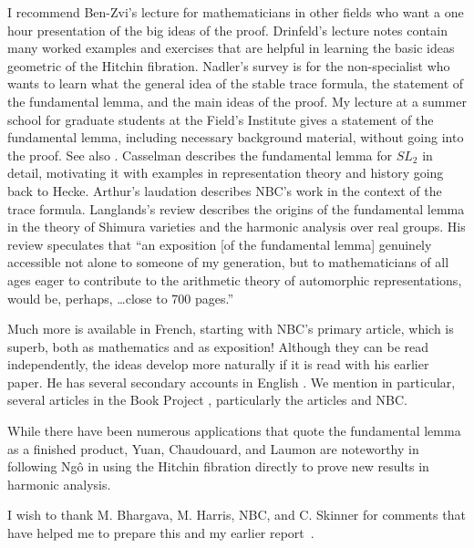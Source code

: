 \documentclass[brochure,english,12pt]{bourbaki}
\begin{document}
I recommend Ben-Zvi's lecture for mathematicians in other fields who
want a one hour presentation of the big ideas of the proof.
Drinfeld's lecture notes contain many worked examples and exercises
that are helpful in learning the basic ideas geometric of the Hitchin
fibration.  Nadler's survey is for the non-specialist who wants to
learn what the general idea of the stable trace formula, the statement
of the fundamental lemma, and the main ideas of the proof.  My lecture
at a summer school for graduate students at the Field's Institute
gives a statement of the fundamental lemma, including necessary
background material, without going into the proof.  See also
\cite{Hales}.  Casselman describes the fundamental lemma for $SL_2$ in
detail, motivating it with examples in representation theory and
history going back to Hecke.  Arthur's laudation describes NBC's work
in the context of the trace formula.  Langlands's review describes the
origins of the fundamental lemma in the theory of Shimura varieties
and the harmonic analysis over real groups.  His review speculates
that ``an exposition [of the fundamental lemma] genuinely accessible
not alone to someone of my generation, but to mathematicians of all
ages eager to contribute to the arithmetic theory of automorphic
representations, would be, perhaps, \ldots close to 700 pages.''


Much more is available in French, starting with NBC's primary article,
which is superb, both as mathematics and as exposition!  Although they
can be read independently, the ideas develop more naturally if it is
read with his earlier paper.  He has several secondary accounts in
English \cite{XX}.  We mention in particular, several articles in the
Book Project \cite{Harris}, particularly the articles \cite{Dat}
and NBC.

While there have been numerous applications that quote the fundamental
lemma as a finished product, Yuan, Chaudouard, and Laumon are
noteworthy in following Ng\^o in using the Hitchin fibration directly to
prove new results in harmonic analysis.

I wish to thank M. Bhargava, M. Harris, NBC, and C. Skinner for comments that
have helped me to prepare this and my earlier report~\cite{XX}.
\end{document}
